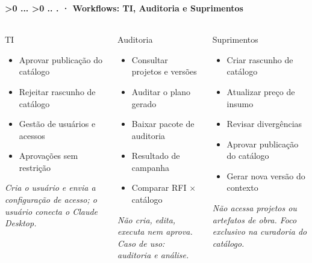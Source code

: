 \documentclass[aspectratio=169,10pt]{beamer}
\newcounter{mlc3}[subsection]
\newcounter{mlc4}[mlc3]
\newcommand{\pathnum}{%
  \ifnum\value{mlc4}>0
    \thesection.\thesubsection.\arabic{mlc3}.\arabic{mlc4}%
  \else\ifnum\value{mlc3}>0
    \thesection.\thesubsection.\arabic{mlc3}%
  \else
    \thesection.\thesubsection%
  \fi\fi
}
\newcommand{\mtitle}[1]{%
  \frametitle{\insertsection}%
  \framesubtitle{\pathnum\;·\; #1}}
\begin{document}
\begin{frame}
  \mtitle{Workflows: TI, Auditoria e Suprimentos}
  \begin{columns}[T]
    \begin{block}{TI}
      \scriptsize
      \begin{itemize}\scriptsize
        \item Aprovar publicação do catálogo
        \item Rejeitar rascunho de catálogo
        \item Gestão de usuários e acessos
        \item Aprovações sem restrição
      \end{itemize}
      \vspace{4pt}
      {\scriptsize\itshape Cria o usuário e envia a configuração de
      acesso; o usuário conecta o Claude Desktop.}
    \end{block}
    \begin{block}{Auditoria}
      \scriptsize
      \begin{itemize}\scriptsize
        \item Consultar projetos e versões
        \item Auditar o plano gerado
        \item Baixar pacote de auditoria
        \item Resultado de campanha
        \item Comparar RFI $\times$ catálogo
      \end{itemize}
      \vspace{4pt}
      {\scriptsize\itshape Não cria, edita, executa nem aprova. Caso de
      uso: auditoria e análise.}
    \end{block}
    \begin{block}{Suprimentos}
      \scriptsize
      \begin{itemize}\scriptsize
        \item Criar rascunho de catálogo
        \item Atualizar preço de insumo
        \item Revisar divergências
        \item Aprovar publicação do catálogo
        \item Gerar nova versão do contexto
      \end{itemize}
      \vspace{4pt}
      {\scriptsize\itshape Não acessa projetos ou artefatos de obra.
      Foco exclusivo na curadoria do catálogo.}
    \end{block}
  \end{columns}
\end{frame}
\end{document}
